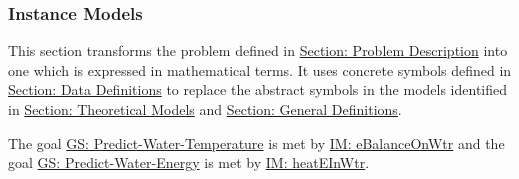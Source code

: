 \documentclass[12pt]{article}
\begin{document}
\subsubsection{Instance Models}
\label{Sec:IMs}
This section transforms the problem defined in \hyperref[Sec:ProbDesc]{Section: Problem Description} into one which is expressed in mathematical terms. It uses concrete symbols defined in \hyperref[Sec:DDs]{Section: Data Definitions} to replace the abstract symbols in the models identified in \hyperref[Sec:TMs]{Section: Theoretical Models} and \hyperref[Sec:GDs]{Section: General Definitions}.

The goal \hyperref[waterTempGS]{GS: Predict-Water-Temperature} is met by \hyperref[IM:eBalanceOnWtr]{IM: eBalanceOnWtr} and the goal \hyperref[waterEnergyGS]{GS: Predict-Water-Energy} is met by \hyperref[IM:heatEInWtr]{IM: heatEInWtr}.
\end{document}
